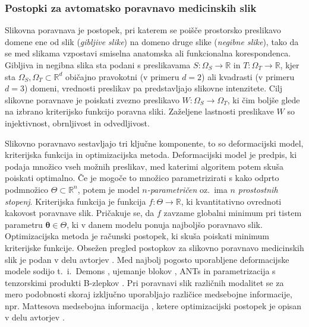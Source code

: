 \documentclass[a4paper,twoside,11pt]{article}
\begin{document}
	\subsubsection*{Postopki za avtomatsko poravnavo medicinskih slik}
	\par{
	  Slikovna poravnava je postopek, pri katerem se poišče prostorsko preslikavo domene ene od slik (\emph{gibljive slike}) na domeno druge slike (\emph{negibne slike}), tako da se med slikama vzpostavi smiselna anatomska ali funkcionalna korespondenca. Gibljiva in negibna slika sta podani s preslikavama $S\colon\Omega_S\rightarrow\mathbb{R}$ in $T\colon\Omega_T\rightarrow\mathbb{R}$, kjer sta $\Omega_S, \Omega_T\subset\mathbb{R}^d$ običajno pravokotni (v primeru $d=2$) ali kvadrasti (v primeru $d=3$) domeni, vrednosti preslikav pa predstavljajo slikovne intenzitete. Cilj slikovne poravnave je poiskati zvezno preslikavo $W:\Omega_S\rightarrow\Omega_T$, ki čim boljše glede na izbrano kriterijsko funkcijo poravna sliki. Zaželjene lastnosti preslikave $W$ so injektivnost, obrnljivost in odvedljivost.
	}
	\par{
	  Slikovno poravnavo sestavljajo tri ključne komponente, to so deformacijski model, kriterijska funkcija in optimizacijska metoda. Deformacijski model je predpis, ki podaja množico vseh možnih preslikav, med katerimi algoritem potem skuša poiskati optimalno. Če je mogoče to množico parametrizirati s kako odprto podmnožico $\Theta\subset\mathbb{R}^n$, potem je model \emph{$n$-parametričen} oz.~ima \emph{$n$ prostostnih stopenj}. Kriterijska funkcija je funkcija $f\colon\Theta\rightarrow\mathbb{R}$, ki kvantitativno ovrednoti kakovost poravnave slik. Pričakuje se, da $f$ zavzame globalni minimum pri tistem parametru $\mathbf{\theta}\in\Theta$, ki v danem modelu ponuja najboljšo poravnavo slik. Optimizacijska metoda je računski postopek, ki skuša poiskati minimum kriterijske funkcije. Obsežen pregled postopkov za slikovno poravnavo medicinskih slik je podan v delu avtorjev \cite{sotiras2013}. Med najbolj pogosto uporabljene deformacijske modele sodijo t.~i.~Demons \citep{vercauteren2009}, ujemanje blokov \citep{ourselin2000}, ANTs \citep{avants2008} in parametrizacija s tenzorskimi produkti B-zlepkov \citep{rueckert1999}. Pri poravnavi slik različnih modalitet se za mero podobnosti skoraj izključno uporabljajo različice medsebojne informacije, npr. Mattesova medsebojna informacija \citep{mattes2003}, ketere optimizacijski postopek je opisan v delu avtorjev \cite{thevenaz2000}.
	}
\end{document}
